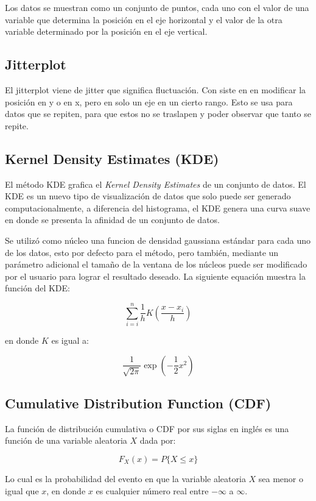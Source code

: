 \documentclass[a4paper]{article}
\begin{document}
Los datos se muestran como un conjunto de puntos, cada uno con el valor de una variable que determina la posición en el eje horizontal y el valor de la otra variable determinado por la posición en el eje vertical.

\subsection{Jitterplot}
El jitterplot viene de jitter que significa fluctuación. Con siste en en modificar la posición en y o en x, pero en solo un eje en un cierto rango. Esto se usa para datos que se repiten, para que estos no se traslapen y poder observar que tanto se repite.

\subsection{Kernel Density Estimates (KDE)}

El método KDE grafica el \textit{Kernel Density Estimates} de un conjunto de datos. El KDE es un nuevo tipo de visualización de datos que solo puede ser generado computacionalmente, a diferencia del histograma, el KDE genera una curva suave en donde se presenta la afinidad de un conjunto de datos.

Se utilizó como núcleo una funcion de densidad gaussiana estándar para cada uno de los datos, esto por defecto para el método, pero también, mediante un parámetro adicional el tamaño de la ventana de los núcleos puede ser modificado por el usuario para lograr el resultado deseado. La siguiente equación muestra la función del KDE:

$$\sum_{i=i}^n{\frac{1}{h}K \left( \frac{x-x_i}{h} \right)}$$

en donde $K$ es igual a:

$$ \frac{1}{\sqrt{2 \pi}} \exp{ \left( - \frac{1}{2}x^2 \right)} $$

\subsection{Cumulative Distribution Function (CDF)}

La función de distribución cumulativa o CDF por sus siglas en inglés es una función de una variable aleatoria $X$ dada por:

$$ F_X(x) = P\{X \le x\} $$

Lo cual es la probabilidad del evento en que la variable aleatoria $X$ sea menor o igual que $x$, en donde  $x$ es cualquier número real entre $-\infty$ a $\infty$. 
\end{document}
